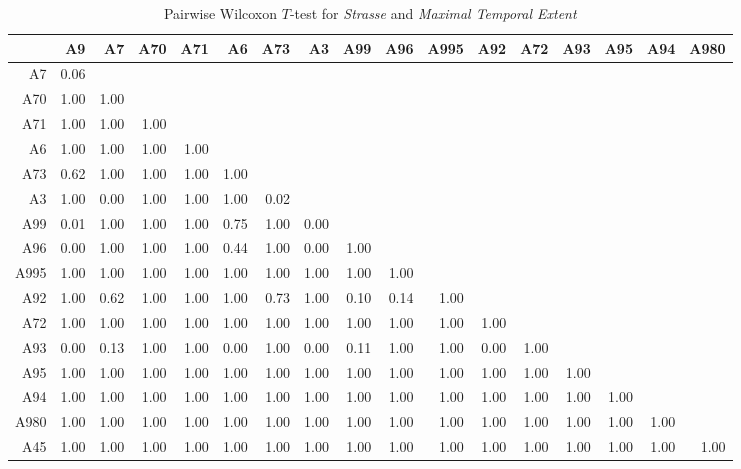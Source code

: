 \begin{table}[ht!]
	\tiny
	\setlength{\tabcolsep}{4pt}
	\centering
  \begin{tabular}{rrrrrrrrrrrrrrrrr}
    \hline
         & A9 & A7 & A70 & A71 & A6 & A73 & A3 & A99 & A96 & A995 & A92 & A72 & A93 & A95 & A94 & A980 \\ 
    \hline
    A7   & 0.06 &  &  &  &  &  &  &  &  &  &  &  &  &  &  &  \\ 
    A70  & 1.00 & 1.00 &  &  &  &  &  &  &  &  &  &  &  &  &  &  \\ 
    A71  & 1.00 & 1.00 & 1.00 &  &  &  &  &  &  &  &  &  &  &  &  &  \\ 
    A6   & 1.00 & 1.00 & 1.00 & 1.00 &  &  &  &  &  &  &  &  &  &  &  &  \\ 
    A73  & 0.62 & 1.00 & 1.00 & 1.00 & 1.00 &  &  &  &  &  &  &  &  &  &  &  \\ 
    A3   & 1.00 & 0.00 & 1.00 & 1.00 & 1.00 & 0.02 &  &  &  &  &  &  &  &  &  &  \\ 
    A99  & 0.01 & 1.00 & 1.00 & 1.00 & 0.75 & 1.00 & 0.00 &  &  &  &  &  &  &  &  &  \\ 
    A96  & 0.00 & 1.00 & 1.00 & 1.00 & 0.44 & 1.00 & 0.00 & 1.00 &  &  &  &  &  &  &  &  \\ 
    A995 & 1.00 & 1.00 & 1.00 & 1.00 & 1.00 & 1.00 & 1.00 & 1.00 & 1.00 &  &  &  &  &  &  &  \\ 
    A92  & 1.00 & 0.62 & 1.00 & 1.00 & 1.00 & 0.73 & 1.00 & 0.10 & 0.14 & 1.00 &  &  &  &  &  &  \\ 
    A72  & 1.00 & 1.00 & 1.00 & 1.00 & 1.00 & 1.00 & 1.00 & 1.00 & 1.00 & 1.00 & 1.00 &  &  &  &  &  \\ 
    A93  & 0.00 & 0.13 & 1.00 & 1.00 & 0.00 & 1.00 & 0.00 & 0.11 & 1.00 & 1.00 & 0.00 & 1.00 &  &  &  &  \\ 
    A95  & 1.00 & 1.00 & 1.00 & 1.00 & 1.00 & 1.00 & 1.00 & 1.00 & 1.00 & 1.00 & 1.00 & 1.00 & 1.00 &  &  &  \\ 
    A94  & 1.00 & 1.00 & 1.00 & 1.00 & 1.00 & 1.00 & 1.00 & 1.00 & 1.00 & 1.00 & 1.00 & 1.00 & 1.00 & 1.00 &  &  \\ 
    A980 & 1.00 & 1.00 & 1.00 & 1.00 & 1.00 & 1.00 & 1.00 & 1.00 & 1.00 & 1.00 & 1.00 & 1.00 & 1.00 & 1.00 & 1.00 &  \\ 
    A45  & 1.00 & 1.00 & 1.00 & 1.00 & 1.00 & 1.00 & 1.00 & 1.00 & 1.00 & 1.00 & 1.00 & 1.00 & 1.00 & 1.00 & 1.00 & 1.00 \\ 
    \hline
  \end{tabular}
	\caption{Pairwise Wilcoxon $T$-test for \textit{Strasse} and \textit{Maximal Temporal Extent}}
	\label{tbl:wilcoxon_baysis_matched_Strasse_TMax}
\end{table}
